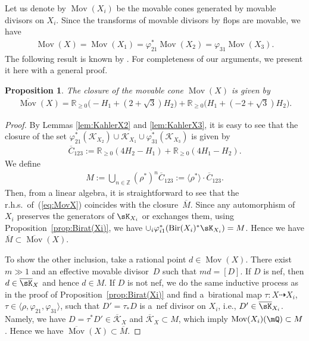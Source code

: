 \documentclass[pdftex]{sigma}
\numberwithin{equation}{section}
\newtheorem{Proposition}[Theorem]{Proposition}
\begin{document}
Let us denote by $\operatorname{Mov}(X_{i})$ be the movable cones generated
by movable divisors on $X_{i}$. Since the transforms of movable divisors
by flops are movable, we have
\begin{gather*}
\operatorname{Mov}(X)=\operatorname{Mov}(X_{1})=\varphi_{21}^{*}\operatorname{Mov}(X_{2})=\varphi_{31}\operatorname{Mov}(X_{3}).
\end{gather*}
 The following result is known by \cite[Lemma~1]{Fry}. For completeness of our arguments, we present it here with a general proof.
\begin{Proposition}
The closure of the movable cone $\operatorname{Mov}(X)$ is given by
\begin{gather}
\overline{\operatorname{Mov}}(X)=\mathbb{R}_{\geq0}\big({-}H_{1}+(2+\sqrt{3})H_{2}\big) +\mathbb{R}_{\geq0}\big(H_{1}+(-2+\sqrt{3})H_{2}\big).\label{eq:MovX}
\end{gather}
\end{Proposition}
\begin{proof}By Lemmas \ref{lem:KahlerX2} and \ref{lem:KahlerX3}, it is easy to see that the closure of the set $\varphi_{21}^{*}(\mathcal{K}_{X_{2}})\cup\mathcal{K}_{X_{1}}\cup\varphi_{31}^{*}(\mathcal{K}_{X_{3}})$ is given by
\begin{gather*}
\overline{C}_{123}:=\mathbb{R}_{\geq0}(4H_{2}-H_{1})+\mathbb{R}_{\geq0}(4H_{1}-H_{2}).
\end{gather*}
We define
\begin{gather*}
M:=\bigcup_{n\in\mathbb{Z}}(\rho^{*})^{n}\overline{C}_{123}:=\langle\rho^{*}\rangle\cdot\overline{C}_{123}.
\end{gather*}
Then, from a linear algebra, it is straightforward to see that the r.h.s.\ of~(\ref{eq:MovX}) coincides with the closure~$\overline{M}$. Since any automorphism of $X_{i}$ preserves the generators of $\sK_{X_{i}}$ or exchanges them, using Proposition~\ref{prop:Birat(Xi)}, we have $\cup_{i}\varphi_{i1}^{*}(\operatorname{Bir}(X_{i})^{*}\sK_{X_{i}})=M$. Hence we have $\overline{M}\subset\overline{\operatorname{Mov}}(X)$.

To show the other inclusion, take a rational point $d\in\operatorname{Mov}(X)$. There exist $m\gg1$ and an effective movable divisor~$D$ such that
$md=[D]$. If $D$ is nef, then $d\in\overline{\sK}_{X}$ and hence $d\in M$. If $D$ is not nef, we do the same inductive process as in the proof of Proposition~\ref{prop:Birat(Xi)} and find a~birational map $\tau\colon X\dashrightarrow X_{i}$, $\tau\in\langle\rho,\varphi_{21}, \varphi_{31}\rangle$, such that $D'=\tau_{*}D$ is a~nef divisor on $X_{i}$, i.e., $D'\in\overline{\sK}_{X_{i}}$. Namely, we have $D=\tau^{*}D'\in\overline{\mathcal{K}}_{X}$ and $\overline{\mathcal{K}}_{X}\subset M$, which imply $\operatorname{Mov}(X_{i})(\mQ)\subset M$. Hence we have $\overline{\operatorname{Mov}}(X)\subset\overline{M}$.
\end{proof}
\end{document}
